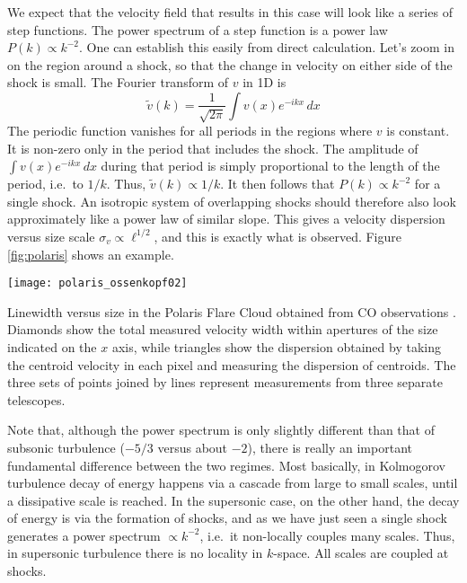 We expect that the velocity field that results in this case will look like a series of step functions. The power spectrum of a step function is a power law $P(k)\propto k^{-2}$. One can establish this easily from direct calculation. Let's zoom in on the region around a shock, so that the change in velocity on either side of the shock is small. The Fourier transform of $v$ in 1D is
\begin{equation}
\tilde{v}(k) = \frac{1}{\sqrt{2\pi}} \int v(x) e^{-i kx}\, dx
\end{equation}
The periodic function vanishes for all periods in the regions where $v$ is constant. It is non-zero only in the period that includes the shock. The amplitude of $\int v(x) e^{-i kx}\, dx$ during that period is simply proportional to the length of the period, i.e.\ to $1/k$. Thus, $\tilde{v}(k)\propto 1/k$. It then follows that $P(k)\propto k^{-2}$ for a single shock. An isotropic system of overlapping shocks should therefore also look approximately like a power law of similar slope. This gives a velocity dispersion versus size scale $\sigma_v\propto \ell^{1/2}$, and this is exactly what is observed. Figure \ref{fig:polaris} shows an example.

\begin{marginfigure}
\texttt{[image: polaris\_ossenkopf02]}
\caption[Linewidth versus size in the Polaris Flare cloud]{
\label{fig:polaris}
Linewidth versus size in the Polaris Flare Cloud obtained from CO observations \citep{ossenkopf02a}. Diamonds show the total measured velocity width within apertures of the size indicated on the $x$ axis, while triangles show the dispersion obtained by taking the centroid velocity in each pixel and measuring the dispersion of centroids. The three sets of points joined by lines represent measurements from three separate telescopes.
}
\end{marginfigure}

Note that, although the power spectrum is only slightly different than that of subsonic turbulence ($-5/3$ versus about $-2$), there is really an important fundamental difference between the two regimes. Most basically, in Kolmogorov turbulence decay of energy happens via a cascade from large to small scales, until a dissipative scale is reached. In the supersonic case, on the other hand, the decay of energy is via the formation of shocks, and as we have just seen a single shock generates a power spectrum $\propto k^{-2}$, i.e.\ it non-locally couples many scales. Thus, in supersonic turbulence there is no locality in $k$-space. All scales are coupled at shocks.

